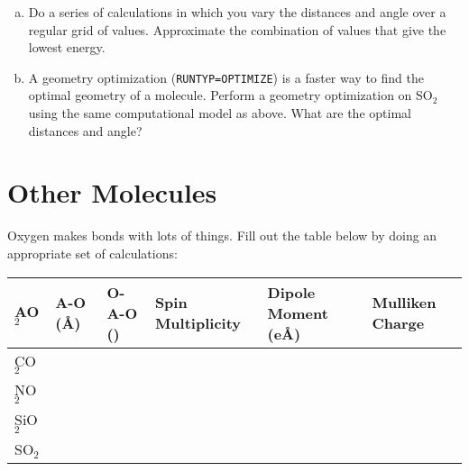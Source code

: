 \documentclass[11pt]{article}
\begin{document}
\begin{enumerate}[(a)]
\item Do a series of calculations in which you vary the  distances and  angle over a regular grid of values. Approximate the combination of values that give the lowest energy.

\item A geometry optimization (\texttt{RUNTYP=OPTIMIZE}) is a faster way to find the optimal geometry of a molecule. Perform a geometry optimization on SO\(_{\text{2}}\) using the same computational model as above. What are the optimal  distances and  angle?
\end{enumerate}

\section{Other Molecules}
\label{sec:orgc1ec993}
Oxygen makes bonds with lots of things. Fill out the table below by doing an appropriate set of calculations:

\begin{center}
\begin{tabular}{llllll}
AO\(_{\text{2}}\) & A-O (\AA{}) & O-A-O (\textdegree{}) & Spin Multiplicity & Dipole Moment (e\AA{}) & Mulliken Charge\\
\hline
CO\(_{\text{2}}\) &  &  &  &  & \\
NO\(_{\text{2}}\) &  &  &  &  & \\
SiO\(_{\text{2}}\) &  &  &  &  & \\
SO\(_{\text{2}}\) &  &  &  &  & \\
\end{tabular}
\end{center}
\end{document}
